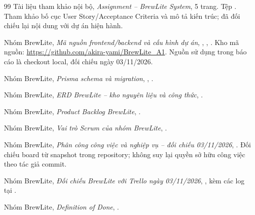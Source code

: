 \clearpage
{}
{}
\begin{thebibliography}{99}
Tài liệu tham khảo nội bộ, \textit{Assignment -- BrewLite System}, 5 trang.
Tệp .
Tham khảo bố cục User Story/Acceptance Criteria và mô tả kiến trúc;
đã đối chiếu lại nội dung với dự án hiện hành.

Nhóm BrewLite, \textit{Mã nguồn frontend/backend và cấu hình dự án},
, , .
Kho mã nguồn: \url{https://github.com/akira-yami/BrewLite_A1}.
Nguồn sử dụng trong báo cáo là checkout local, đối chiếu ngày 03/11/2026.

Nhóm BrewLite, \textit{Prisma schema và migration},
,
.

Nhóm BrewLite, \textit{ERD BrewLite -- kho nguyên liệu và công thức},
.

Nhóm BrewLite, \textit{Product Backlog BrewLite},
.

Nhóm BrewLite, \textit{Vai trò Scrum của nhóm BrewLite},
.

Nhóm BrewLite, \textit{Phân công công việc và nghiệp vụ -- đối chiếu 03/11/2026},
.
Đối chiếu board từ snapshot trong repository; không suy lại quyền sở hữu
công việc theo tác giả commit.

Nhóm BrewLite, \textit{Đối chiếu BrewLite với Trello ngày 03/11/2026},
, kèm các log tại
.

Nhóm BrewLite, \textit{Definition of Done},
.
\end{thebibliography}
